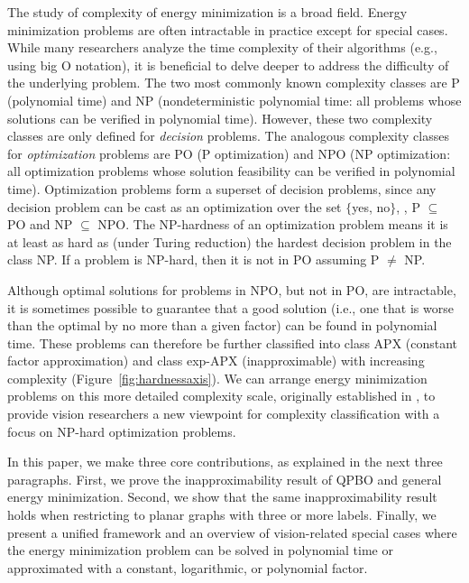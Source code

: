 %

The study of complexity of energy minimization is a broad field. Energy minimization problems are often intractable in practice except for special cases.  While many researchers analyze the time complexity of their algorithms (e.g., using big O notation), it is beneficial to delve deeper to address the difficulty of the underlying problem.  The two most commonly known complexity classes are P (polynomial time) and NP (nondeterministic polynomial time: all problems whose solutions can be verified in polynomial time). However, these two complexity classes are only defined for {\em decision} problems. The analogous complexity classes for {\em optimization} problems are PO (P optimization) and NPO (NP optimization: all optimization problems whose solution feasibility can be verified in polynomial time). Optimization problems form a superset of decision problems, since any decision problem can be cast as an optimization over the set $\{$yes, no$\}$, \ie, P $\subseteq$ PO and NP $\subseteq$ NPO. The NP-hardness of an optimization problem means it is at least as hard as (under Turing reduction) the hardest decision problem in the class NP. If a problem is NP-hard, then it is not in PO assuming P $\neq$ NP. 

Although optimal solutions for problems in NPO, but not in PO, are intractable, it is sometimes possible to guarantee that a good solution (i.e., one that is worse than the optimal by no more than a given factor) can be found in polynomial time.  These problems can therefore be further classified into class APX (constant factor approximation) and class exp-APX (inapproximable) with increasing complexity (Figure~\ref{fig:hardnessaxis}).  We can arrange energy minimization problems on this more detailed complexity scale, originally established in \cite{ausiello1999complexity}, to provide vision researchers a new viewpoint for complexity classification with a focus on NP-hard optimization problems.


In this paper, we make three core contributions, as explained in the next three paragraphs. First, we prove the inapproximability result of QPBO and general energy minimization. Second, we show that the same inapproximability result holds when restricting to planar graphs with three or more labels.
Finally, we present a unified framework and an overview of vision-related special cases where the energy minimization problem can be solved in polynomial time or approximated with a constant, logarithmic, or polynomial factor. 


